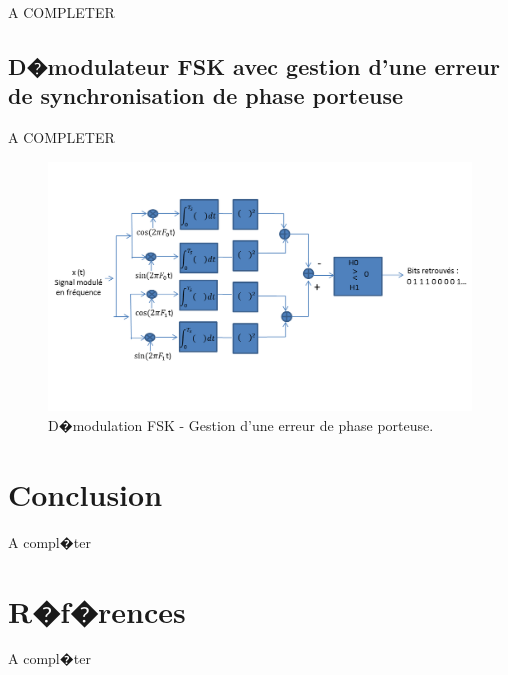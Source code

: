 \documentclass[frenchb]{article}
\begin{document}
    A COMPLETER

    \subsection{D�modulateur FSK avec gestion d'une erreur de synchronisation de phase porteuse}
    A COMPLETER

    \begin{figure}[ht!]
        \centering
        \includegraphics[width=14cm]{demod_FSK2.png}
        \caption{D�modulation FSK - Gestion d'une erreur de phase porteuse. \label{fig : demod_FSK2}}
     \end{figure}

\section{Conclusion}
A compl�ter

\section{R�f�rences}
A compl�ter
\end{document}
